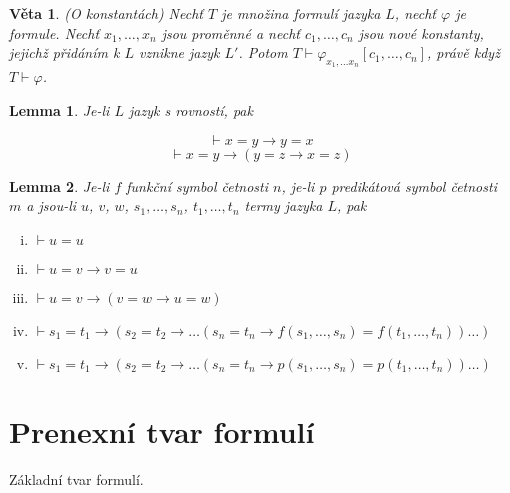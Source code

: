 \documentclass[a4paper, 11pt]{report}
\newtheorem{veta}{Věta}
\newtheorem{lemma}{Lemma}
\begin{document}
\begin{veta}
(O konstantách) Nechť $T$ je množina formulí jazyka $L$, nechť $\varphi$ je formule. Nechť $x_1, \dots, x_n$ jsou proměnné a nechť $c_1, \dots, c_n$ jsou nové konstanty, jejichž přidáním k $L$ vznikne jazyk $L'$. Potom $T \vdash \varphi_{x_1, \dots x_n}[c_1, \dots, c_n]$, právě když $T \vdash \varphi$.
\end{veta}

\begin{lemma}
Je-li $L$ jazyk s rovností, pak

$$ \vdash x = y \to y = x $$
$$ \vdash x = y \to (y = z \to x = z) $$
\end{lemma}

\begin{lemma}
Je-li $f$ funkční symbol četnosti $n$, je-li $p$ predikátová symbol četnosti $m$ a jsou-li $u$, $v$, $w$, $s_1, \dots, s_n$, $t_1, \dots, t_n$ termy jazyka $L$, pak
\begin{enumerate}[(i)]
	\item $\vdash u = u $
	\item $\vdash u = v \to v = u $
	\item $\vdash u = v \to (v = w \to u = w) $
	\item $\vdash s_1 = t_1 \to (s_2 = t_2 \to \dots (s_n = t_n \to f(s_1, \dots, s_n) = f(t_1, \dots, t_n)) \dots ) $
	\item $\vdash s_1 = t_1 \to (s_2 = t_2 \to \dots (s_n = t_n \to p(s_1, \dots, s_n) = p(t_1, \dots, t_n)) \dots ) $
\end{enumerate}
\end{lemma}

\section{Prenexní tvar formulí}
Základní tvar formulí.
\end{document}
